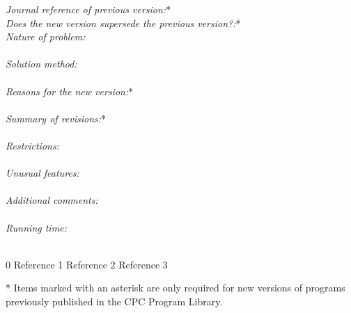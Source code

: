 \documentclass[preprint,12pt]{elsarticle}
\begin{document}
\begin{small}
{\em Journal reference of previous version:}*                  \\
{\em Does the new version supersede the previous version?:}*   \\
{\em Nature of problem:}\\
   \\
{\em Solution method:}\\
   \\
{\em Reasons for the new version:}*\\
   \\
{\em Summary of revisions:}*\\
   \\
{\em Restrictions:}\\
   \\
{\em Unusual features:}\\
   \\
{\em Additional comments:}\\
   \\
{\em Running time:}\\
   \\

\begin{thebibliography}{0}
Reference 1         %
Reference 2         %
Reference 3         %
\end{thebibliography}
* Items marked with an asterisk are only required for new versions
of programs previously published in the CPC Program Library.\\
\end{small}


\section{}
\label{}
\end{document}

